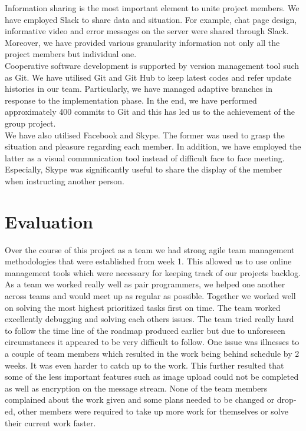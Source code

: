 \documentclass{article}
\begin{document}
Information sharing is the most important element to unite project members. We have employed Slack \cite{slack} to share data and situation. For example, chat page design, informative video and error messages on the server were shared through Slack. Moreover, we have provided various granularity information not only all the project members but individual one.\\

Cooperative software development is supported by version management tool such as Git\cite{git}. We have utilised Git and Git Hub to keep latest codes and refer update histories in our team. Particularly, we have managed adaptive branches in response to the implementation phase. In the end, we have performed approximately 400 commits to Git and this has led us to the achievement of the group project.\\
We have also utilised Facebook and Skype. The former was used to grasp the situation and pleasure regarding each member. In addition, we have employed the latter as a visual communication tool instead of difficult face to face meeting. Especially, Skype was significantly useful to share the display of the member when instructing another person.



\section{Evaluation}


	Over the course of this project as a team we had strong agile team management methodologies that were established from week 1. This allowed us to use online management tools which were necessary for keeping track of our projects backlog. As a team we worked really well as pair programmers, we helped one another across teams and would meet up as regular as possible. Together we worked well on solving the most highest prioritized tasks first on time. The team worked excellently debugging and solving each others issues. The team tried really hard to follow the time line of the roadmap produced earlier but due to unforeseen circumstances it appeared to be very difficult to follow. One issue was illnesses to a couple of team members which resulted in the work being behind schedule by 2 weeks. It was even harder to catch up to the work. This further resulted that some of the less important features such as image upload could not be completed as well as encryption on the message stream. None of the team members complained about the work given and some plans needed to be changed or drop-ed, other members were required to take up more work for themselves or solve their current work faster.\par
	
\end{document}
